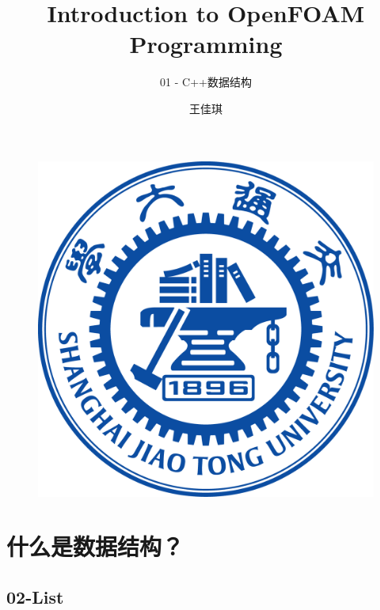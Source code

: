\documentclass{beamer}
\author{{王佳琪}}
\title{Introduction to OpenFOAM Programming}
\subtitle{01 - C++数据结构}
\institute{\kaishu{上海交通大学}}
\date{\kaishu{2022年1月}}
\begin{document}
\songti
\begin{frame}
    \titlepage
    \begin{figure}[htpb]
        \begin{center}
            \includegraphics[width=0.15\linewidth]{pic/WUT.png}
        \end{center}
    \end{figure}
\end{frame}

\begin{frame}
    \tableofcontents[sectionstyle=show,subsectionstyle=show/shaded/hide,subsubsectionstyle=show/shaded/hide]
\end{frame}






\section{什么是数据结构？}








\subsection{02-List}


% 
% 
% 
% 
% 
% 
% 
% 
% 
% 


% 
% 
\end{document}
